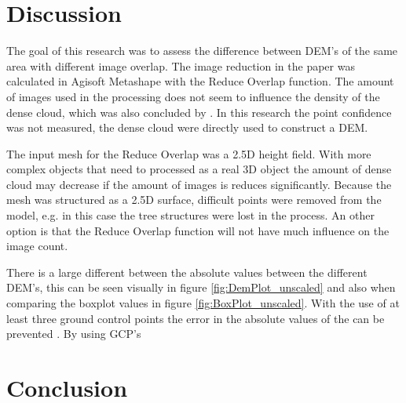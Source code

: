 \documentclass{isprs} %
\begin{document}
\section{Discussion}
The goal of this research was to assess the difference between DEM's of the same area with different image overlap. 
The image reduction in the paper was calculated in Agisoft Metashape with the Reduce Overlap function.
The amount of images used in the processing does not seem to influence the density of the dense cloud, which was also concluded by \citet{EffectofUABimgcamover}.
In this research the point confidence was not measured, the dense cloud were directly used to construct a DEM.

The input mesh for the Reduce Overlap was a 2.5D height field. 
With more complex objects that need to processed as a real 3D object the amount of dense cloud may decrease if the amount of images is reduces significantly.
Because the mesh was structured as a 2.5D surface, difficult points were removed from the model, e.g. in this case the tree structures were lost in the process.
An other option is that the Reduce Overlap function will not have much influence on the image count.

There is a large different between the absolute values between the different DEM's, this can be seen visually in figure \ref{fig:DemPlot_unscaled} and also when comparing the boxplot values in figure \ref{fig:BoxPlot_unscaled}.
With the use of at least three ground control points the error in the absolute values of the can be prevented \citep{AssessingUAVGCPS}.
By using GCP's 

\section{Conclusion}

\sloppy




{
	\begin{spacing}{1.17}
		\normalsize
	\end{spacing}
}



\vspace{1cm}
\end{document}
